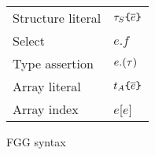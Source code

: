 \documentclass[acmsmall,screen]{acmart}
\begin{document}
\begin{figure}
{\begin{minipage}[t]{0.4\textwidth}
\begin{tabular}[t]{ll}
                \quad Structure literal      & \quad ${\color{black}\tau_S}\texttt{\{}\overline{e}\texttt{\}}$                  \\
                \quad Select                 & \quad $e.f$                                        \\
                \quad Type assertion         & \quad $e.({\color{black}\tau})$                           \\
                \quad Array literal          & \quad$t_A\texttt{\{}\overline{e}\texttt{\}}$                              \\
                \quad Array index            & \quad$e$[$e$]
            \end{tabular}
        \end{minipage}
    }
    \caption{FGG syntax}
    \vspace{3ex}
\end{figure}
\end{document}
